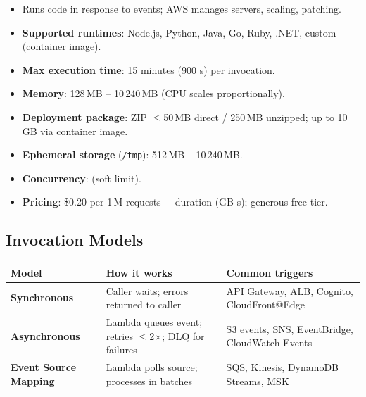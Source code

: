 

\begin{keyfacts}
\begin{itemize}
  \item Runs code in response to events; AWS manages servers, scaling, patching.
  \item \textbf{Supported runtimes}: Node.js, Python, Java, Go, Ruby, .NET, custom (container image).
  \item \textbf{Max execution time}: 15 minutes (900 s) per invocation.
  \item \textbf{Memory}: 128\,MB -- 10\,240\,MB (CPU scales proportionally).
  \item \textbf{Deployment package}: ZIP $\leq$50\,MB direct / 250\,MB unzipped; up to 10\,GB via container image.
  \item \textbf{Ephemeral storage} (\texttt{/tmp}): 512\,MB -- 10\,240\,MB.
  \item \textbf{Concurrency}:  (soft limit).
  \item \textbf{Pricing}: \$0.20 per 1\,M requests + duration (GB-s); generous free tier.
\end{itemize}
\end{keyfacts}

\subsection{Invocation Models}

\begin{comparebox}[title={Lambda invocation models}]
\begin{tabular}{@{}p{2.8cm}p{4.2cm}p{4.6cm}@{}}
\toprule
\textbf{Model} & \textbf{How it works} & \textbf{Common triggers} \\
\midrule
\textbf{Synchronous} & Caller waits; errors returned to caller &
  API Gateway, ALB, Cognito, CloudFront@Edge \\[4pt]
\textbf{Asynchronous} & Lambda queues event; retries $\leq$2$\times$; DLQ for failures &
  S3 events, SNS, EventBridge, CloudWatch Events \\[4pt]
\textbf{Event Source Mapping} & Lambda polls source; processes in batches &
  SQS, Kinesis, DynamoDB Streams, MSK \\
\bottomrule
\end{tabular}
\end{comparebox}

